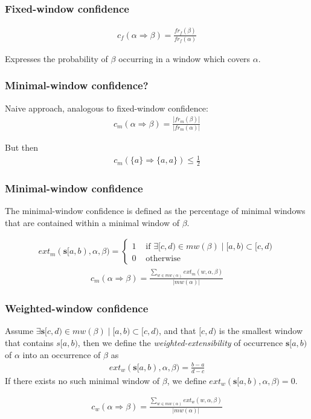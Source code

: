 \documentclass[dvipsnames]{beamer}
\begin{document}
\begin{frame}
\frametitle{Fixed-window confidence}

\begin{align*}
c_f(\alpha \Rightarrow \beta) = \frac{ fr_f(\beta) }{ fr_f(\alpha) }
\end{align*}

Expresses the probability of $ \beta $ occurring in a window which covers $ \alpha $.

\end{frame}
\begin{frame}
\frametitle{Minimal-window confidence?}

Naive approach, analogous to fixed-window confidence:
\begin{align*}
c_m(\alpha \Rightarrow \beta) = \frac{| fr_m(\beta) |}{| fr_m(\alpha) |}
\end{align*}
\pause
\par\bigskip
But then\begin{align*}c_m(\{ a \} \Rightarrow \{ a, a \}) \leq \frac12 \end{align*}

\end{frame}
\begin{frame}
\frametitle{Minimal-window confidence}

The minimal-window confidence is defined as the percentage of minimal windows that are contained within a minimal window of $ \beta $.

\begin{align*}
ext_m(\boldsymbol{s}[a, b), \alpha, \beta) =
\begin{cases}
    1 & \text{ if } \exists [c, d) \in mw(\beta) \mid [a, b) \subset [c, d) \\
    0 & \text{ otherwise}
\end{cases}
\end{align*}
\begin{align*}
c_m(\alpha \Rightarrow \beta) = \frac{\sum_{w \in mw(\alpha)} ext_m(w, \alpha, \beta)}{| mw(\alpha) |}
\end{align*}

\end{frame}
\begin{frame}
\frametitle{Weighted-window confidence}

Assume $ \exists \boldsymbol{s}[c, d) \in mw(\beta) \mid [a, b) \subset [c, d) $, and that $ [c, d) $ is the smallest window that contains $ s[a, b) $, then we define the \emph{weighted-extensibility} of occurrence $ \boldsymbol{s}[a, b) $ of $ \alpha $ into an occurrence of $ \beta $ as
\begin{align*}
ext_w(\boldsymbol{s}[a, b), \alpha, \beta) = \frac{b - a}{d - c}
\end{align*}
If there exists no such minimal window of $ \beta $, we define $ ext_w(\boldsymbol{s}[a, b), \alpha, \beta) = 0 $.

\begin{align*}
c_w(\alpha \Rightarrow \beta) = \frac{\sum_{w \in mw(\alpha)} ext_w(w, \alpha, \beta)}{| mw(\alpha) |}
\end{align*}

\end{frame}
\end{document}
